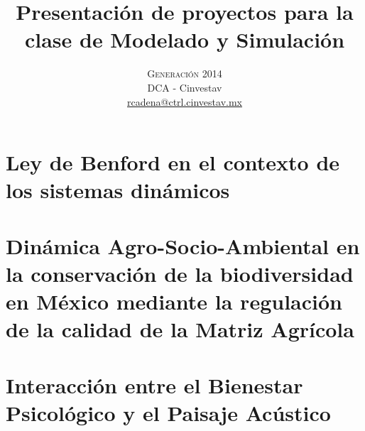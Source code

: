 



\title{\vspace{-15mm}\fontsize{24pt}{10pt}\selectfont\textbf{Presentación de proyectos para la clase de Modelado y Simulación}} %

\author{
\large \textsc{Generación 2014}\\[2mm] %
\normalsize DCA - Cinvestav \\ %
\normalsize \href{mailto:rcadena@ctrl.cinvestav.mx}{rcadena@ctrl.cinvestav.mx} %
\vspace{-5mm}
}
\date{}




    \maketitle %
    \thispagestyle{fancy} %


    \chapter{Ley de Benford en el contexto de los sistemas dinámicos}
    \begin{multicols}{2}
        
    \end{multicols}

    \chapter{Dinámica Agro-Socio-Ambiental en la conservación de la biodiversidad en México mediante la regulación de la calidad de la Matriz Agrícola}
    \begin{multicols}{2}
        
    \end{multicols}

    \chapter{Interacción entre el Bienestar Psicológico y el Paisaje Acústico}






